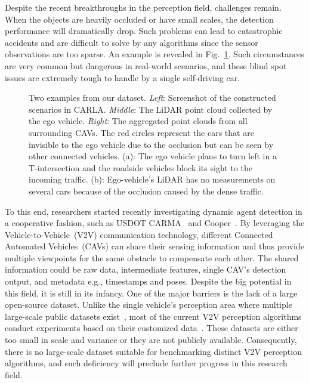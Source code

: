 \documentclass[letterpaper, 10 pt, conference]{ieeeconf}
\begin{document}
Despite the recent breakthroughs in the perception field, challenges remain. When the objects are heavily occluded or have small scales, the detection performance will dramatically drop. Such problems can lead to catastrophic accidents and are difficult to solve by any algorithms since the sensor observations are too sparse. An example is revealed in Fig.~\ref{fig:overview-a}. Such circumstances are very common but dangerous in real-world scenarios, and these blind spot issues are extremely tough to handle by a single self-driving car. 



\begin{figure*}[!t]
\centering
\begin{subfigure}[c]{0.9\linewidth}
    \caption{}
    \label{fig:overview-a}
\end{subfigure}
\begin{subfigure}[c]{0.9\linewidth}
    \caption{}
\end{subfigure}
\caption{Two examples from our dataset. \emph{Left}: Screenshot of the constructed scenarios in CARLA. \emph{Middle}: The LiDAR point cloud collected by the ego vehicle. \emph{Right}: The aggregated point clouds from all surrounding CAVs. The red circles represent the cars that are invisible to the ego vehicle due to the occlusion but can be seen by other connected vehicles. (a): The ego vehicle plans to turn left in a T-intersection and the roadside vehicles block its sight to the incoming traffic. (b): Ego-vehicle's LiDAR has no measurements on several cars because of the occlusion caused by the dense traffic.}
\label{fig:overview}
\end{figure*}


To this end, researchers started recently investigating dynamic agent detection in a cooperative fashion, such as USDOT CARMA~\cite{lochrane2020carma} and Cooper~\cite{cooper}. By leveraging the Vehicle-to-Vehicle~(V2V) communication technology, different Connected Automated Vehicles~(CAVs) can share their sensing information and thus provide multiple viewpoints for the same obstacle to compensate each other. The shared information could be raw data, intermediate features, single CAV's detection output, and metadata e.g., timestamps and poses. Despite the big potential in this field, it is still in its infancy. One of the major barriers is the lack of a large open-source dataset. Unlike the single vehicle's perception area where multiple large-scale public datasets exist~\cite{nuscenes2019, sun2020scalability, Geiger2013IJRR}, most of the current V2V perception algorithms conduct experiments based on their customized data~\cite{Wang2020V2VNetVC, rawaw018, Zhang2021DistributedDM}. These datasets are either too small in scale and variance or they are not publicly available. Consequently, there is no large-scale dataset suitable for benchmarking distinct V2V perception algorithms, and such deficiency will preclude further progress in this research field. 
\end{document}
